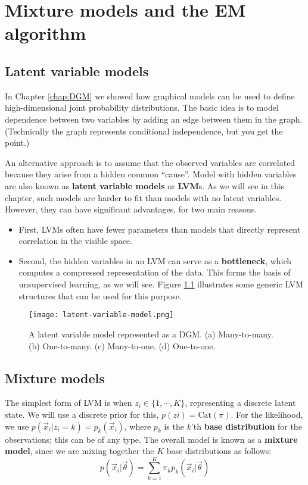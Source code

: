 \chapter{Mixture models and the EM algorithm}
\label{chap:EM-algorithm}


\section{Latent variable models}
In Chapter \ref{chap:DGM} we showed how graphical models can be used to define high-dimensional joint probability distributions. The basic idea is to model dependence between two variables by adding an edge between them in the graph. (Technically the graph represents conditional
independence, but you get the point.)

An alternative approach is to assume that the observed variables are correlated because they arise from a hidden common “cause”. Model with hidden variables are also known as \textbf{latent variable models} or \textbf{LVM}s. As we will see in this chapter, such models are harder to fit than models with no latent variables. However, they can have significant advantages, for two main reasons.
\begin{itemize}
\item{First, LVMs often have fewer parameters than models that directly represent correlation in the visible space.}
\item{Second, the hidden variables in an LVM can serve as a \textbf{bottleneck}, which computes a compressed representation of the data. This forms the basis of unsupervised learning, as we will see. Figure \ref{fig:latent-variable-model} illustrates some generic LVM structures that can be used for this purpose.}
\end{itemize}

\begin{figure}[hbtp]
\centering
    \texttt{[image: latent-variable-model.png]}
\caption{A latent variable model represented as a DGM. (a) Many-to-many. (b) One-to-many. (c) Many-to-one. (d) One-to-one.}
\label{fig:latent-variable-model} 
\end{figure}


\section{Mixture models}
The simplest form of LVM is when $z_i \in \{1,\cdots,K\}$, representing a discrete latent state. We will use a discrete prior for this, $p(zi)=\mathrm{Cat}(\pi)$. For the likelihood, we use $p(\vec{x}_i|z_i =k)=p_k(\vec{x}_i)$, where $p_k$ is the $k$'th \textbf{base distribution} for the observations; this can be of any type. The overall model is known as a \textbf{mixture model}, since we are mixing together the $K$ base distributions as follows:
\begin{equation}
p(\vec{x}_i|\vec{\theta})=\sum\limits_{k=1}^K \pi_kp_k(\vec{x}_i|\vec{\theta})
\end{equation}

